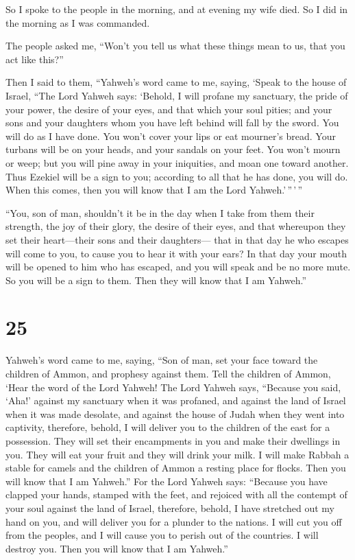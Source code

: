  So I spoke to the people in the morning, and at evening
my wife died. So I did in the morning as I was commanded.

 The people asked me, ``Won't you tell us what these
things mean to us, that you act like this?''

 Then I said to them, ``Yahweh's word came to me, saying,
 `Speak to the house of Israel, ``The Lord Yahweh says:
`Behold, I will profane my sanctuary, the pride of your power, the
desire of your eyes, and that which your soul pities; and your sons and
your daughters whom you have left behind will fall by the sword.
 You will do as I have done. You won't cover your lips or
eat mourner's bread.  Your turbans will be on your heads,
and your sandals on your feet. You won't mourn or weep; but you will
pine away in your iniquities, and moan one toward another.
 Thus Ezekiel will be a sign to you; according to all
that he has done, you will do. When this comes, then you will know that
I am the Lord Yahweh.'\,''\,'\,''

 ``You, son of man, shouldn't it be in the day when I
take from them their strength, the joy of their glory, the desire of
their eyes, and that whereupon they set their heart---their sons and
their daughters---  that in that day he who escapes will
come to you, to cause you to hear it with your ears?  In
that day your mouth will be opened to him who has escaped, and you will
speak and be no more mute. So you will be a sign to them. Then they will
know that I am Yahweh.''

\hypertarget{section-24}{%
\section{25}\label{section-24}}

 Yahweh's word came to me, saying,  ``Son of
man, set your face toward the children of Ammon, and prophesy against
them.  Tell the children of Ammon, `Hear the word of the
Lord Yahweh! The Lord Yahweh says, ``Because you said, `Aha!' against my
sanctuary when it was profaned, and against the land of Israel when it
was made desolate, and against the house of Judah when they went into
captivity,  therefore, behold, I will deliver you to the
children of the east for a possession. They will set their encampments
in you and make their dwellings in you. They will eat your fruit and
they will drink your milk.  I will make Rabbah a stable
for camels and the children of Ammon a resting place for flocks. Then
you will know that I am Yahweh.''  For the Lord Yahweh
says: ``Because you have clapped your hands, stamped with the feet, and
rejoiced with all the contempt of your soul against the land of Israel,
 therefore, behold, I have stretched out my hand on you,
and will deliver you for a plunder to the nations. I will cut you off
from the peoples, and I will cause you to perish out of the countries. I
will destroy you. Then you will know that I am Yahweh.''

